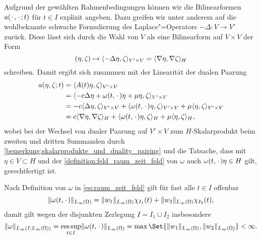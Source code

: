 \documentclass[../main.tex]{subfiles}
\begin{document}
Aufgrund der gewählten Rahmenbedingungen können wir die Bilinearformen $a({\mkern2mu\cdot\mkern2mu}, {\mkern2mu\cdot\mkern2mu}; t)$ für $t \in I$ explizit angeben.
Dazu greifen wir unter anderem auf die wohlbekannte schwache Formulierung des Laplace"=Operators $- \Delta \colon V \to V'$ zurück.
Diese lässt sich durch die Wahl von $V$ als eine Bilinearform auf $V \times V$ der Form
\begin{equation}
    (\eta, \zeta) \mapsto \langle- \Delta \eta,\zeta\rangle_{V' \times V} = \langle\nabla \eta,\nabla \zeta\rangle_{H}
\end{equation}
schreiben.
Damit ergibt sich zusammen mit der Linearität der dualen Paarung
\begin{equation}
\label{eq:bilinearform_formel}
    \begin{aligned}
        a(\eta, \zeta; t)
            &= \langle A(t) \eta,\zeta\rangle_{V' \times V}
          \\&= \langle-c\Delta \eta + \omega(t, {\mkern2mu\cdot\mkern2mu}) \eta + \mu \eta,\zeta\rangle_{V' \times V}
          \\&= - c\langle\Delta \eta,\zeta\rangle_{V' \times V} + \langle\omega(t, {\mkern2mu\cdot\mkern2mu}) \eta,\zeta\rangle_{V' \times V} + \mu \langle\eta,\zeta\rangle_{V' \times V}
          \\&= c\langle\nabla \eta,\nabla \zeta\rangle_{H} + \langle\omega(t, {\mkern2mu\cdot\mkern2mu}) \eta,\zeta\rangle_{H} + \mu \langle\eta,\zeta\rangle_{H},
    \end{aligned}
\end{equation}
wobei bei der Wechsel von dualer Paarung auf $V' \times V$ zum $H$-Skalarprodukt beim zweiten und dritten Summanden durch \cref{bemerkung:skalarprodukte_und_duality_pairing} und die Tatsache, dass mit $\eta \in V \subset H$ und der \cref{definition:feld_raum_zeit_feld} von $\omega$ auch $\omega(t, {\mkern2mu\cdot\mkern2mu}) \eta \in H$ gilt, gerechtfertigt ist.

\begin{Bemerkung}
\label{bemerkung:raum_zeit_feld_norm_zeitunabhaengig}
    Nach Definition von $\omega$ in \cref{eq:raum_zeit_feld} gilt für fast alle $t \in I$ offenbar
    \begin{equation}
        \lVert\omega(t, {\mkern2mu\cdot\mkern2mu})\rVert_{L_{\infty}(\Omega)} = \lVert w_{1}\rVert_{L_{\infty}(\Omega)} \chi_{I_{1}}(t) + \lVert w_{2}\rVert_{L_{\infty}(\Omega)} \chi_{I_{2}}(t),
    \end{equation}
    damit gilt wegen der disjunkten Zerlegung $I = I_{1} \cup I_{2}$ insbesondere
    \begin{equation}
        \norm{\omega}_{L_{\infty}(I; L_{\infty}(\Omega))} = \esssup_{t \in I} \norm{\omega(t, \blank)}_{L_{\infty}(\Omega)} = \max\Set{ \norm{w_{1}}_{L_{\infty}(\Omega)}, \norm{w_{2}}_{L_{\infty}(\Omega)} } < \infty.
    \end{equation}
\end{Bemerkung}
\end{document}
